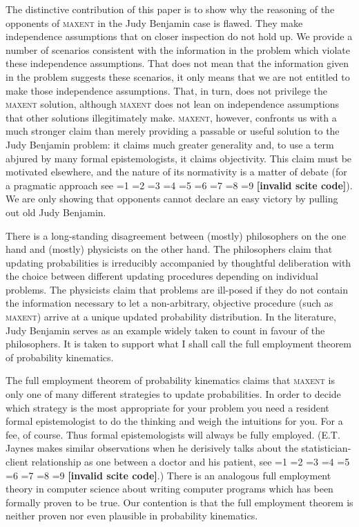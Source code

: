 \documentclass[smallextended]{svjour3}       %
\newcommand{\PageP}{p.~}
\newcommand{\PageP}{}
\newcommand{\scite}[3]{\ifnum#1=1\cite{#2}\else
\ifnum#1=2\cite[{\PageP}~#3]{#2}\else
\ifnum#1=3\cite[{\PageP}~#3]{#2}\else
\ifnum#1=4\cite{#2}\else
\ifnum#1=5\cite{#2}\else
\ifnum#1=6\cite[{\PageP}~#3]{#2}\else
\ifnum#1=7\cite{#2}\else
\ifnum#1=8\cite[{\PageP}~#3]{#2}\else
\ifnum#1=9\cite[{\PageP}~#3]{#2}\else
\textbf{[invalid scite code]}\fi\fi\fi\fi\fi\fi\fi\fi\fi}
\begin{document}
The distinctive contribution of this paper is to show why the
reasoning of the opponents of \textsc{maxent} in the Judy Benjamin
case is flawed. They make independence assumptions that on closer
inspection do not hold up. We provide a number of scenarios consistent
with the information in the problem which violate these independence
assumptions. That does not mean that the information given in the
problem suggests these scenarios, it only means that we are not
entitled to make those independence assumptions. That, in turn, does
not privilege the \textsc{maxent} solution, although \textsc{maxent}
does not lean on independence assumptions that other solutions
illegitimately make. \textsc{maxent}, however, confronts us with a
much stronger claim than merely providing a passable or useful
solution to the Judy Benjamin problem: it claims much greater
generality and, to use a term abjured by many formal epistemologists,
it claims objectivity. This claim must be motivated elsewhere, and the
nature of its normativity is a matter of debate (for a pragmatic
approach see \scite{7}{caticha12}{}). We are only showing that
opponents cannot declare an easy victory by pulling out old Judy
Benjamin.

There is a long-standing disagreement between (mostly) philosophers on
the one hand and (mostly) physicists on the other hand. The
philosophers claim that updating probabilities is irreducibly
accompanied by thoughtful deliberation with the choice between
different updating procedures depending on individual problems. The
physicists claim that problems are ill-posed if they do not contain
the information necessary to let a non-arbitrary, objective procedure
(such as \textsc{maxent}) arrive at a unique updated probability
distribution. In the literature, Judy Benjamin serves as an example
widely taken to count in favour of the philosophers. It is taken to
support what I shall call the full employment theorem of probability
kinematics.

The full employment theorem of probability kinematics claims that
\textsc{maxent} is only one of many different strategies to update
probabilities. In order to decide which strategy is the most
appropriate for your problem you need a resident formal epistemologist
to do the thinking and weigh the intuitions for you. For a fee, of
course. Thus formal epistemologists will always be fully employed.
(E.T. Jaynes makes similar observations when he derisively talks about
the statistician-client relationship as one between a doctor and his
patient, see \scite{8}{jaynes98}{492 and 506}.) There is an analogous
full employment theory in computer science about writing computer
programs which has been formally proven to be true. Our contention is
that the full employment theorem is neither proven nor even plausible
in probability kinematics.
\end{document}
